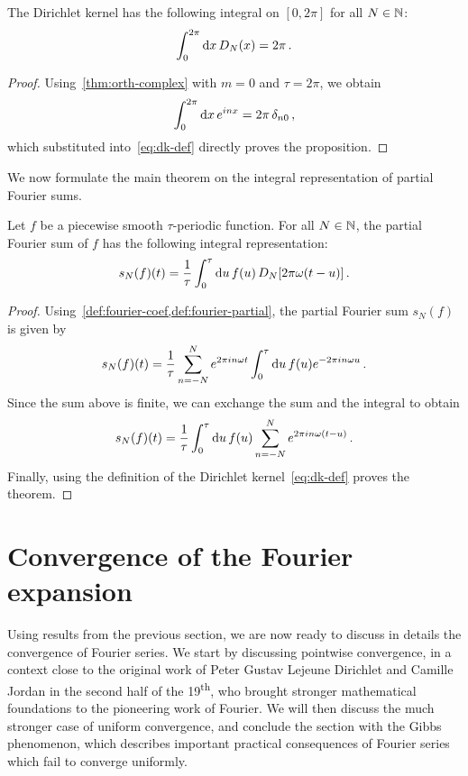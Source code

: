 \begin{proposition}
	\label{prop:dk-int}
	The Dirichlet kernel has the following integral on $[0,2\pi]$ for all $N\in\mathbb{N}$:
	\begin{equation}
		\int_0^{2\pi}\mathrm{d} x\,D_N(x)=2\pi\,.
	\end{equation}
\end{proposition}
\begin{proof}
	Using~\cref{thm:orth-complex} with $m=0$ and $\tau=2\pi$, we obtain
	\begin{equation}
		\int_{0}^{2\pi}\mathrm{d} x\,e^{inx}=2\pi\,\delta_{n0}\,,
	\end{equation}
	which substituted into~\cref{eq:dk-def} directly proves the proposition.
\end{proof}
We now formulate the main theorem on the integral representation of partial Fourier sums.
\begin{theorem}
	\label{thm:fourier-dk-rep}
	Let $f$ be a piecewise smooth $\tau$-periodic function. For all $N\in\mathbb{N}$, the partial
	Fourier sum of $f$ has the following integral representation:
	\begin{equation}
		s_N(f)(t)=\frac{1}{\tau}\int_0^{\tau}\mathrm{d} u\,f(u)\,D_N[2\pi\omega(t-u)]\,.
	\end{equation}
\end{theorem}
\begin{proof}
	Using~\cref{def:fourier-coef,def:fourier-partial}, the partial Fourier sum $s_N(f)$ is
	given by
	\begin{equation}
		s_N(f)(t)=\frac{1}{\tau}\sum_{n=-N}^{N}e^{2\pi i n\omega t}
		\int_0^\tau\mathrm{d} u\,f(u)e^{-2\pi i n\omega u}\,.
	\end{equation}
	Since the sum above is finite, we can exchange the sum and the integral to obtain
	\begin{equation}
		s_N(f)(t)=\frac{1}{\tau}\int_0^\tau\mathrm{d} u\,f(u)\sum_{n=-N}^{N}e^{2\pi i
				n\omega (t-u)}\,.
	\end{equation}
	Finally, using the definition of the Dirichlet kernel~\cref{eq:dk-def} proves the
	theorem.
\end{proof}
\section{Convergence of the Fourier expansion}
Using results from the previous section, we are now ready to discuss in details the
convergence of Fourier series. We start by discussing pointwise convergence, in a context
close to the original work of Peter Gustav Lejeune Dirichlet and Camille Jordan in the
second half of the 19\textsuperscript{th}, who brought stronger mathematical foundations
to the pioneering work of Fourier. We will then discuss the much stronger case of uniform
convergence, and conclude the section with the Gibbs phenomenon, which describes
important practical consequences of Fourier series which fail to converge uniformly.
